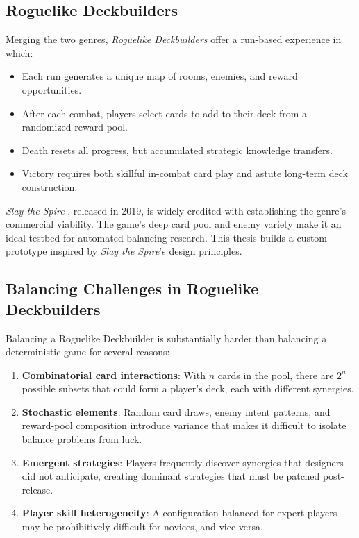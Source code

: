 \subsection{Roguelike Deckbuilders}

Merging the two genres, \textit{Roguelike Deckbuilders} offer a run-based experience in which:
\begin{itemize}
    \item Each run generates a unique map of rooms, enemies, and reward opportunities.
    \item After each combat, players select cards to add to their deck from a randomized reward pool.
    \item Death resets all progress, but accumulated strategic knowledge transfers.
    \item Victory requires both skillful in-combat card play and astute long-term deck construction.
\end{itemize}
\textit{Slay the Spire} \cite{slaythespire}, released in 2019, is widely credited with establishing the genre's commercial viability. The game's deep card pool and enemy variety make it an ideal testbed for automated balancing research. This thesis builds a custom prototype inspired by \textit{Slay the Spire}'s design principles.

\subsection{Balancing Challenges in Roguelike Deckbuilders}

Balancing a Roguelike Deckbuilder is substantially harder than balancing a deterministic game for several reasons:
\begin{enumerate}
    \item \textbf{Combinatorial card interactions}: With $n$ cards in the pool, there are $2^n$ possible subsets that could form a player's deck, each with different synergies.
    \item \textbf{Stochastic elements}: Random card draws, enemy intent patterns, and reward-pool composition introduce variance that makes it difficult to isolate balance problems from luck.
    \item \textbf{Emergent strategies}: Players frequently discover synergies that designers did not anticipate, creating dominant strategies that must be patched post-release.
    \item \textbf{Player skill heterogeneity}: A configuration balanced for expert players may be prohibitively difficult for novices, and vice versa.
\end{enumerate}

